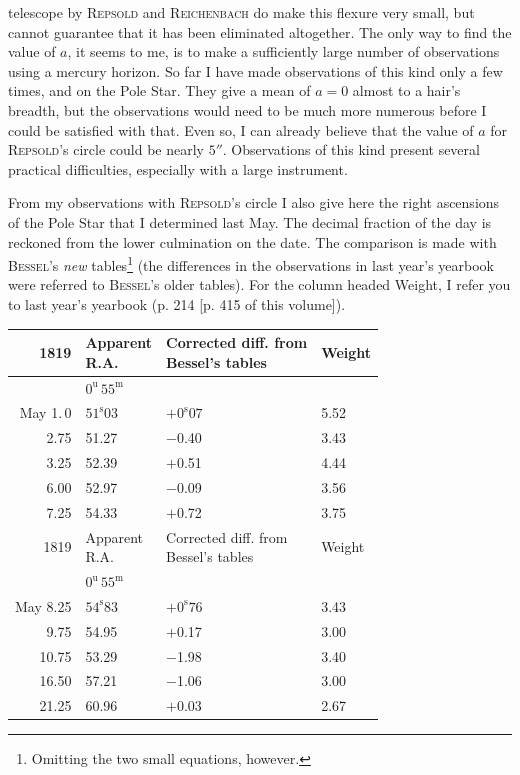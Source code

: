 telescope by \textsc{Repsold} and \textsc{Reichenbach} do make this flexure very small, but cannot guarantee that it has been eliminated altogether. The only way to find the value of $a$, it seems to me, is to make a sufficiently large number of observations using a mercury horizon. So far I have made observations of this kind only a few times, and on the Pole Star. They give a mean of $a=0$ almost to a hair’s breadth, but the observations would need to be much more numerous before I could be satisfied with that. Even so, I can already believe that the value of $a$ for \textsc{Repsold}’s circle could be nearly $5''$. Observations of this kind present several practical difficulties, especially with a large instrument.

\par\indent From my observations with \textsc{Repsold}’s circle I also give here the right ascensions of the Pole Star that I determined last May. The decimal fraction of the day is reckoned from the lower culmination on the date. The comparison is made with \textsc{Bessel}’s \emph{new} tables\footnote{Omitting the two small equations, however.} (the differences in the observations in last year’s yearbook were referred to \textsc{Bessel}’s older tables). For the column headed Weight, I refer you to last year’s yearbook (p. 214 [p. 415 of this volume]).

\begin{center}
\begin{tabular}{r|l|l|l}
1819  &  \shortstack{Apparent\\R.A.}  &  \shortstack{Corrected diff. from\\Bessel’s tables}  &  Weight  \\
\hline
 &  $0^{\mathrm u}\,55^{\mathrm m}$  &   &   \\
May 1.\,0  &  $51^{\mathrm s}03$  &  $+0^{\mathrm s}07$  &  5.52  \\
2.75  &  51.27  &  $-$0.40  &  3.43  \\
3.25  &  52.39  &  $+$0.51  &  4.44  \\
6.00  &  52.97  &  $-$0.09  &  3.56  \\
7.25  &  54.33  &  $+$0.72  &  3.75  \\
\hline
 1819  &  \shortstack{Apparent\\R.A.}  &  \shortstack{Corrected diff. from\\Bessel’s tables}  &  Weight  \\
\hline
  &  $0^{\mathrm u}\,55^{\mathrm m}$  &   &   \\
 May 8.25  &  $54^{\mathrm s}83$  &  $+0^{\mathrm s}76$  &  3.43  \\
 9.75  &  54.95  &  $+$0.17  &  3.00  \\
 10.75  &  53.29  &  $-$1.98  &  3.40  \\
 16.50  &  57.21  &  $-$1.06  &  3.00  \\
 21.25  &  60.96  &  $+$0.03  &  2.67  \\
\end{tabular}
\end{center}

